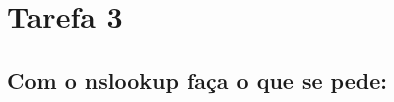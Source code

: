 \section*{Tarefa 3}
\subsection*{Com o nslookup faça o que se pede:}
\begin{questions}
    
\end{questions}